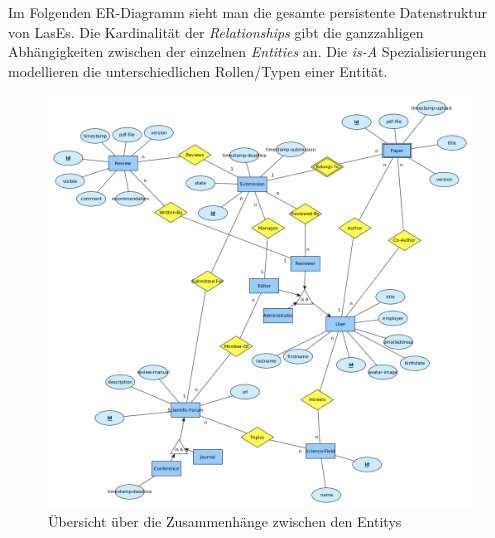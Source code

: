 
Im Folgenden ER-Diagramm sieht man die gesamte persistente Datenstruktur von LasEs. Die Kardinalität der \emph{Relationships} gibt die ganzzahligen Abhängigkeiten zwischen der einzelnen \emph{Entities} an. Die \emph{is-A} Spezialisierungen modellieren die unterschiedlichen Rollen/Typen einer Entität.

\begin{figure}[H]
	\centering
	\includegraphics[width=\linewidth]{graphics/ER-Modell}
	\caption{Übersicht über die Zusammenhänge zwischen den Entitys}
	\label{er:diagramm}
\end{figure}